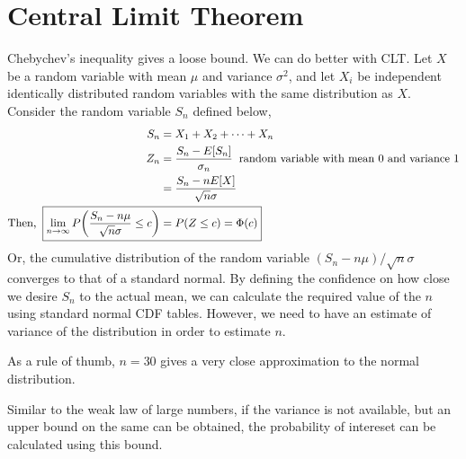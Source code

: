\documentclass[../probability-notes.tex]{subfiles}
\begin{document}
    \section{Central Limit Theorem}
    Chebychev's inequality gives a loose bound. We can do better with CLT. Let $X$ be a random variable with mean $\mu$ and variance $\sigma^{2}$, and let $X_{i}$ be independent identically distributed random variables with the same distribution as $X$. Consider the random variable $S_{n}$ defined below,
    \begin{align*}
        S_{n} &= X_{1} + X_{2} + \cdots + X_{n}\\
        Z_{n} &= \frac{S_{n} - E[S_{n}]}{\sigma_{n}} \text{\;\;random variable with mean $0$ and variance $1$} \\
             &= \frac{S_{n} - nE[X]}{\sqrt{n} \sigma}\\
        \text{Then,\;\;} \Aboxed{\lim_{n \to \infty} P \bigg(\frac{S_{n} - n\mu}{\sqrt{n} \sigma} \leq c \bigg) &= P(Z \leq c) = \Phi(c)}
    \end{align*}
    Or, the cumulative distribution of the random variable $(S_{n} - n\mu)/\sqrt{n} \sigma$ converges to that of a standard normal.\newline
    By defining the confidence on how close we desire $S_{n}$ to the actual mean, we can calculate the required value of the $n$ using standard normal CDF tables. However, we need to have an estimate of variance of the distribution in order to estimate $n$.\newline

    As a rule of thumb, $n=30$ gives a very close approximation to the normal distribution.\newline

    Similar to the weak law of large numbers, if the variance is not available, but an upper bound on the same can be obtained, the probability of intereset can be calculated using this bound.
\end{document}
